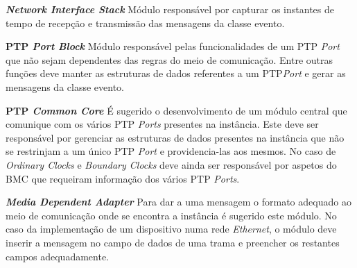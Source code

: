 \textbf{\textit{Network Interface Stack}} Módulo responsável por capturar os instantes de tempo de recepção e transmissão das mensagens da classe evento.

\textbf{PTP \textit{Port Block}} Módulo responsável pelas funcionalidades de um PTP \textit{Port} que não sejam dependentes das regras do meio de comunicação. Entre outras funções deve manter as estruturas de dados referentes a um PTP\textit{Port} e gerar as mensagens da classe evento. 

\textbf{PTP \textit{Common Core}} É sugerido o desenvolvimento de um módulo central que comunique com os vários PTP \textit{Ports} presentes na instância. Este deve ser responsável por gerenciar as estruturas de dados presentes na instância que não se restrinjam a um único PTP \textit{Port} e providencia-las aos mesmos. No caso de \textit{Ordinary Clocks} e \textit{Boundary Clocks} deve ainda ser responsável por aspetos do BMC que requeiram informação dos vários PTP \textit{Ports}.

\textbf{\textit{Media Dependent Adapter}} Para dar a uma mensagem o formato adequado ao meio de comunicação onde se encontra a instância é sugerido este módulo. No caso da implementação de um dispositivo numa rede \textit{Ethernet}, o módulo deve inserir a mensagem no campo de dados de uma trama e preencher os restantes campos adequadamente.